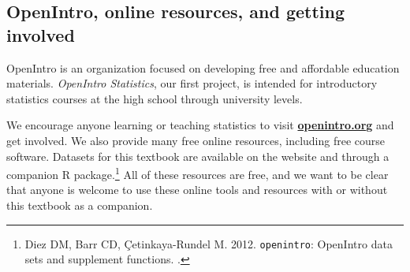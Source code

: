\subsection*{OpenIntro, online resources, and getting involved}

OpenIntro is an organization focused on developing free and affordable education materials. \emph{OpenIntro Statistics}, our first project, is intended for introductory statistics courses at the high school through university levels.


We encourage anyone learning or teaching statistics to visit \href{http://www.openintro.org}{\color{black}\textbf{openintro.org}} and get involved. We also provide many free online resources, including free course software. 
Datasets for this textbook are available on the website and through a companion \textsf{R} package.\footnote{Diez DM, Barr CD, \c{C}etinkaya-Rundel M. 2012. \texttt{openintro}: OpenIntro data sets and supplement functions. .} All of these resources are free, and we want to be clear that anyone is welcome to use these online tools and resources with or without this textbook as a companion.



